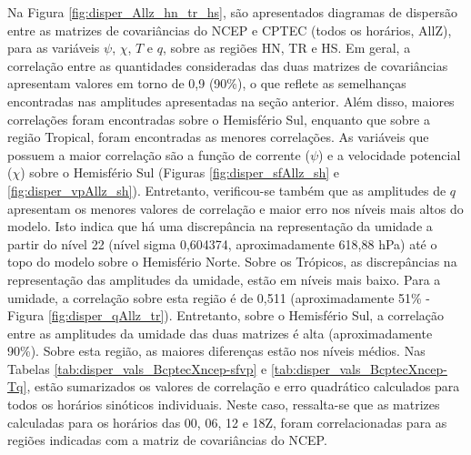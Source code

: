 Na Figura \ref{fig:disper_Allz_hn_tr_hs}, são apresentados diagramas de dispersão entre as matrizes de covariâncias do NCEP e CPTEC (todos os horários, AllZ), para as variáveis $\psi$, $\chi$, $T$ e $q$, sobre as regiões HN, TR e HS. Em geral, a correlação entre as quantidades consideradas das duas matrizes de covariâncias apresentam valores em torno de 0,9 (90\%), o que reflete as semelhanças encontradas nas amplitudes apresentadas na seção anterior. Além disso, maiores correlações foram encontradas sobre o Hemisfério Sul, enquanto que sobre a região Tropical, foram encontradas as menores correlações. As variáveis que possuem a maior correlação são a função de corrente ($\psi$) e a velocidade potencial ($\chi$) sobre o Hemisfério Sul (Figuras \ref{fig:disper_sfAllz_sh} e \ref{fig:disper_vpAllz_sh}). Entretanto, verificou-se também que as amplitudes de $q$ apresentam os menores valores de correlação e maior erro nos níveis mais altos do modelo. Isto indica que há uma discrepância na representação da umidade a partir do nível 22 (nível sigma 0,604374, aproximadamente 618,88 hPa) até o topo do modelo sobre o Hemisfério Norte. Sobre os Trópicos, as discrepâncias na representação das amplitudes da umidade, estão em níveis mais baixo. Para a umidade, a correlação sobre esta região é de 0,511 (aproximadamente 51\% - Figura \ref{fig:disper_qAllz_tr}). Entretanto, sobre o Hemisfério Sul, a correlação entre as amplitudes da umidade das duas matrizes é alta (aproximadamente 90\%). Sobre esta região, as maiores diferenças estão nos níveis médios. Nas Tabelas \ref{tab:disper_vals_BcptecXncep-sfvp} e \ref{tab:disper_vals_BcptecXncep-Tq}, estão sumarizados os valores de correlação e erro quadrático calculados para todos os horários sinóticos individuais. Neste caso, ressalta-se que as matrizes calculadas para os horários das 00, 06, 12 e 18Z, foram correlacionadas para as regiões indicadas com a matriz de covariâncias do NCEP.


